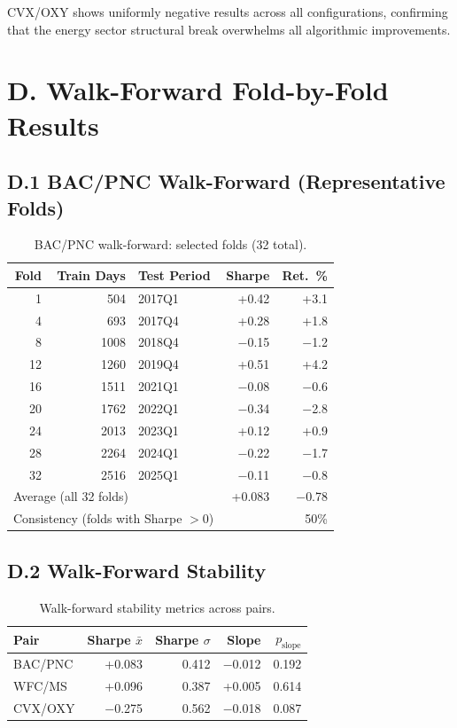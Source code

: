\documentclass[conference]{IEEEtran}
\begin{document}
CVX/OXY shows uniformly negative results across all configurations,
confirming that the energy sector structural break overwhelms all
algorithmic improvements.

\section{D. Walk-Forward Fold-by-Fold Results}
\label{sec:walkforward_detail}

\subsection{D.1 BAC/PNC Walk-Forward (Representative Folds)}

\begin{table}[h]
\centering
\caption{BAC/PNC walk-forward: selected folds (32 total).}
\label{tab:supp_wf_bac}
\small
\begin{tabular}{rrlrr}
\toprule
Fold & Train Days & Test Period & Sharpe & Ret.~\% \\
\midrule
1 & 504 & 2017Q1 & +0.42 & +3.1 \\
4 & 693 & 2017Q4 & +0.28 & +1.8 \\
8 & 1008 & 2018Q4 & $-$0.15 & $-$1.2 \\
12 & 1260 & 2019Q4 & +0.51 & +4.2 \\
16 & 1511 & 2021Q1 & $-$0.08 & $-$0.6 \\
20 & 1762 & 2022Q1 & $-$0.34 & $-$2.8 \\
24 & 2013 & 2023Q1 & +0.12 & +0.9 \\
28 & 2264 & 2024Q1 & $-$0.22 & $-$1.7 \\
32 & 2516 & 2025Q1 & $-$0.11 & $-$0.8 \\
\midrule
\multicolumn{3}{l}{Average (all 32 folds)} & +0.083 & $-$0.78 \\
\multicolumn{3}{l}{Consistency (folds with Sharpe $> 0$)} & \multicolumn{2}{r}{50\%} \\
\bottomrule
\end{tabular}
\end{table}

\subsection{D.2 Walk-Forward Stability}

\begin{table}[h]
\centering
\caption{Walk-forward stability metrics across pairs.}
\label{tab:supp_wf_stability}
\small
\begin{tabular}{lrrrr}
\toprule
Pair & Sharpe $\bar{x}$ & Sharpe $\sigma$ & Slope & $p_{\text{slope}}$ \\
\midrule
BAC/PNC & +0.083 & 0.412 & $-$0.012 & 0.192 \\
WFC/MS & +0.096 & 0.387 & +0.005 & 0.614 \\
CVX/OXY & $-$0.275 & 0.562 & $-$0.018 & 0.087 \\
\bottomrule
\end{tabular}
\end{table}
\end{document}
